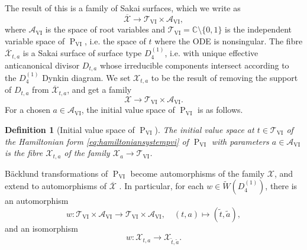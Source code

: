 \documentclass[a4paper,reqno]{amsart}
\numberwithin{equation}{section}
\newcommand{\C}{\mathbb{C}}
\newcommand{\pain}[1]{\operatorname{P}_{\mathrm{#1}}}
\newtheorem{definition}[theorem]{Definition}
\numberwithin{equation}{section}
\begin{document}
The result of this is a family of Sakai surfaces, which we write as 
\begin{equation*}
\overline{\mathcal{X}} \rightarrow \mathscr{T}_{\mathrm{VI}} \times \mathscr{A}_{\mathrm{VI}}, 
\end{equation*}
where $\mathscr{A}_{\mathrm{VI}}$ is the space of root variables and $\mathscr{T}_{\mathrm{VI}}= \C \setminus \{0,1\}$ is the independent variable space of $\pain{VI}$, i.e. the space of $t$ where the ODE is nonsingular.
The fibre 
$\overline{\mathcal{X}}_{t,a}$ is a Sakai surface of surface type $D_4^{(1)}$, i.e. with unique effective anticanonical divisor $D_{t,a}$ whose irreducible components intersect according to the $D_4^{(1)}$ Dynkin diagram.
We set $\mathcal{X}_{t,a}$ to be the result of removing the support of $D_{t,a}$ from $\overline{\mathcal{X}}_{t,a}$, and get a family 
\begin{equation*}
\mathcal{X} \rightarrow \mathscr{T}_{\mathrm{VI}} \times \mathscr{A}_{\mathrm{VI}}.
\end{equation*}
For a chosen $a \in \mathscr{A}_{\mathrm{VI}}$, the initial value space of $\pain{VI}$ is as follows.
\begin{definition}[Initial value space of $\pain{VI}$]
    The initial value space at $t\in \mathscr{T}_{\mathrm{VI}}$ of the Hamiltonian form \eqref{eq:hamiltoniansystempvi} of $\pain{VI}$ with parameters $a\in \mathscr{A}_{\mathrm{VI}}$ is the fibre $\mathcal{X}_{t,a}$ of the family $\mathcal{X}_a\to \mathscr{T}_{\mathrm{VI}}$.
\end{definition}

B\"acklund transformations of $\pain{VI}$ become automorphisms of the family $\mathcal{X}$, and extend to automorphisms of $\overline{\mathcal{X}}$ \cites{sakai2001, BTsonmanifolds,inabaiwasakisaito}.
In particular, for each $w \in \widetilde{W}(D_4^{(1)})$, there is an automorphism 
$$w : \mathscr{T}_{\mathrm{VI}}\times \mathscr{A}_{\mathrm{VI}} \to \mathscr{T}_{\mathrm{VI}}\times \mathscr{A}_{\mathrm{VI}},  \quad (t,a) \mapsto (\tilde{t},\tilde{a}),$$
and an isomorphism
$$w : \mathcal{X}_{t,a}  \rightarrow \mathcal{X}_{\tilde{t},\tilde{a}}.$$
\end{document}
